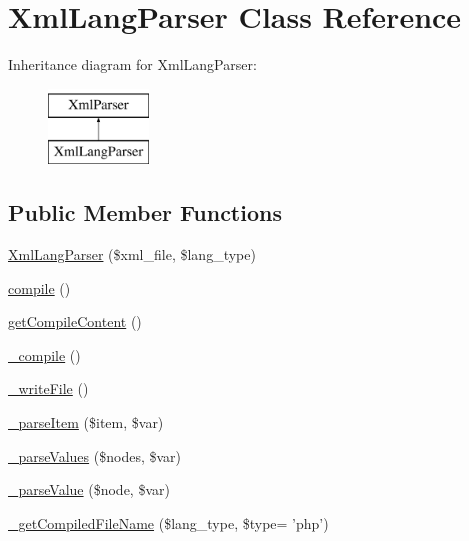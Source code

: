 \hypertarget{classXmlLangParser}{\section{Xml\-Lang\-Parser Class Reference}
\label{classXmlLangParser}
}
Inheritance diagram for Xml\-Lang\-Parser\-:\begin{figure}[H]
\begin{center}
\leavevmode
\includegraphics[height=2.000000cm]{classXmlLangParser}
\end{center}
\end{figure}
\subsection*{Public Member Functions}
\begin{DoxyCompactItemize}
\item 
\hyperlink{classXmlLangParser_a50fff41b01cd305204a85b48702a4e6f}{Xml\-Lang\-Parser} (\$xml\-\_\-file, \$lang\-\_\-type)
\item 
\hyperlink{classXmlLangParser_af0ffe6cf9e15d7af2ca16d5d9b7d5da1}{compile} ()
\item 
\hyperlink{classXmlLangParser_ab022a8d8d0717fbf4c8a171eaf6a54d2}{get\-Compile\-Content} ()
\item 
\hyperlink{classXmlLangParser_a6a27a9fbdd65d3ea3249120f8eb7d9c2}{\-\_\-compile} ()
\item 
\hyperlink{classXmlLangParser_ab49d81ff3d154da6c5d92f0367d33ec9}{\-\_\-write\-File} ()
\item 
\hyperlink{classXmlLangParser_a87379004e371e1812094e2bf802b274c}{\-\_\-parse\-Item} (\$item, \$var)
\item 
\hyperlink{classXmlLangParser_ac5ab3f7e29a914802e1b6144e6e8bcc5}{\-\_\-parse\-Values} (\$nodes, \$var)
\item 
\hyperlink{classXmlLangParser_a45b4e9645eb03c7ff7bdbda239148867}{\-\_\-parse\-Value} (\$node, \$var)
\item 
\hyperlink{classXmlLangParser_ab5049af4a722b0c2f7d8eed3c8c4dac0}{\-\_\-get\-Compiled\-File\-Name} (\$lang\-\_\-type, \$type= 'php')
\end{DoxyCompactItemize}
